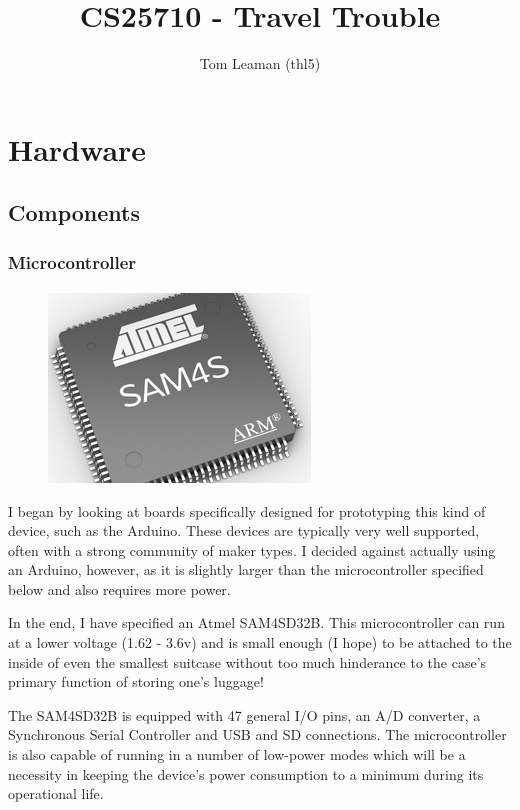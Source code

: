 \documentclass[a4paper, twoside]{article}
\title{CS25710 - Travel Trouble}
\author{Tom Leaman (thl5)}
\begin{document}
\maketitle
\newpage

\section{Hardware}

\subsection{Components}

\subsubsection{Microcontroller}
\begin{figure}
	\begin{center}
		\includegraphics[scale=0.25]{images/atmel_sam4sd32.jpg}
	\end{center}
\end{figure}

I began by looking at boards specifically designed for prototyping this kind of
device, such as the Arduino. These devices are typically very well supported,
often with a strong community of maker types. I decided against actually using
an Arduino, however, as it is slightly larger than the microcontroller specified
below and also requires more power.

In the end, I have specified an Atmel SAM4SD32B. This microcontroller can run at
a lower voltage (1.62 - 3.6v) and is small enough (I hope) to be attached to the
inside of even the smallest suitcase without too much hinderance to the case's
primary function of storing one's luggage!

The SAM4SD32B is equipped with 47 general I/O pins, an A/D converter, a
Synchronous Serial Controller and USB and SD connections. The microcontroller is
also capable of running in a number of low-power modes which will be a necessity
in keeping the device's power consumption to a minimum during its operational
life.
\end{document}
